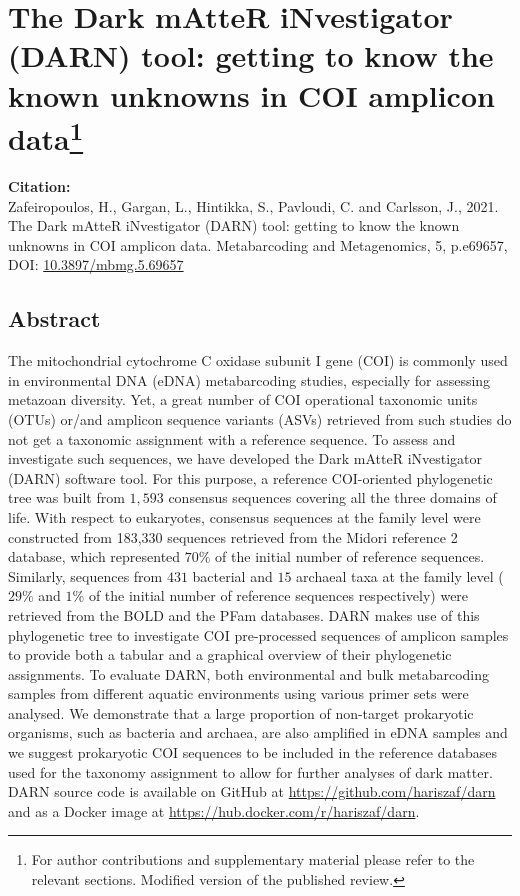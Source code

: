 \newpage

\section[The Dark mAtteR iNvestigator (DARN) tool: getting to know the known unknowns in COI amplicon data]{
      The Dark mAtteR iNvestigator (DARN) tool: getting to know the known unknowns in COI amplicon data\footnote{
      For author contributions and supplementary material please refer to the relevant sections. 
      Modified version of the published review.
   }
}
\label{publ:darn}

\textbf{Citation:} \\
Zafeiropoulos, H., Gargan, L., Hintikka, S., Pavloudi, C. and Carlsson, J., 2021. The Dark mAtteR iNvestigator (DARN) tool: getting to know the known unknowns in COI amplicon data. Metabarcoding and Metagenomics, 5, p.e69657, \\
DOI: \href{https://doi.org/10.3897/mbmg.5.69657}{10.3897/mbmg.5.69657}

   \subsection{Abstract}
   The mitochondrial cytochrome C oxidase subunit I gene (COI) is commonly used in environmental DNA (eDNA) metabarcoding studies, especially for assessing metazoan diversity. 
   Yet, a great number of COI operational taxonomic units (OTUs) or/and amplicon sequence variants (ASVs) retrieved from such studies do not get a taxonomic assignment with a reference sequence. 
   To assess and investigate such sequences, we have developed the Dark mAtteR iNvestigator (DARN) software tool. For this purpose, a reference COI-oriented phylogenetic tree was built from $1,593$ consensus sequences covering all the three domains of life. 
   With respect to eukaryotes, consensus sequences at the family level were constructed from 183,330 sequences retrieved from the Midori reference 2 database, which represented $70\%$ of the initial number of reference sequences. 
   Similarly, sequences from $431$ bacterial and $15$ archaeal taxa at the family level ($29\%$ and $1\%$ of the initial number of reference sequences respectively) were retrieved from the BOLD and the PFam databases. 
   DARN makes use of this phylogenetic tree to investigate COI pre-processed sequences of amplicon samples to provide both a tabular and a graphical overview of their phylogenetic assignments. 
   To evaluate DARN, both environmental and bulk metabarcoding samples from different aquatic environments using various primer sets were analysed. 
   We demonstrate that a large proportion of non-target prokaryotic organisms, such as bacteria and archaea, are also amplified in eDNA samples and we suggest prokaryotic COI sequences to be included in the reference databases used for the taxonomy assignment to allow for further analyses of dark matter. 
   DARN source code is available on GitHub at \href{https://github.com/hariszaf/darn}{https://github.com/hariszaf/darn} and as a Docker image at \href{https://hub.docker.com/r/hariszaf/darn}{https://hub.docker.com/r/hariszaf/darn}.


